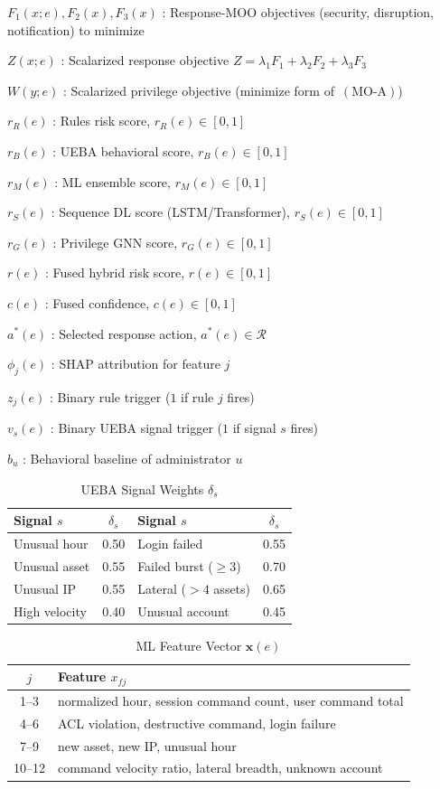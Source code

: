 \documentclass{ieeeaccess}
\begin{document}
$F_1(x;e),F_2(x),F_3(x)$ : Response-MOO objectives (security, disruption, notification) to minimize

$Z(x;e)$ : Scalarized response objective $Z=\lambda_1 F_1+\lambda_2 F_2+\lambda_3 F_3$

$W(y;e)$ : Scalarized privilege objective (minimize form of~$(\mathrm{MO}\text{-}\mathrm{A})$)

$r_R(e)$ : Rules risk score, $r_R(e)\in[0,1]$

$r_B(e)$ : UEBA behavioral score, $r_B(e)\in[0,1]$

$r_M(e)$ : ML ensemble score, $r_M(e)\in[0,1]$

$r_S(e)$ : Sequence DL score (LSTM/Transformer), $r_S(e)\in[0,1]$

$r_G(e)$ : Privilege GNN score, $r_G(e)\in[0,1]$

$r(e)$ : Fused hybrid risk score, $r(e)\in[0,1]$

$c(e)$ : Fused confidence, $c(e)\in[0,1]$

$a^*(e)$ : Selected response action, $a^*(e)\in\mathcal{R}$

$\phi_j(e)$ : SHAP attribution for feature $j$

$z_j(e)$ : Binary rule trigger ($1$ if rule $j$ fires)

$v_s(e)$ : Binary UEBA signal trigger ($1$ if signal $s$ fires)

$b_u$ : Behavioral baseline of administrator $u$
\begin{table}[!t]
\caption{UEBA Signal Weights $\delta_s$}
\label{tab:ueba-signals}
\centering
\footnotesize
\begin{tabular}{lc|lc}
\toprule
\textbf{Signal} $s$ & $\delta_s$ & \textbf{Signal} $s$ & $\delta_s$ \\
\midrule
Unusual hour & 0.50 & Login failed & 0.55 \\
Unusual asset & 0.55 & Failed burst ($\geq 3$) & 0.70 \\
Unusual IP & 0.55 & Lateral ($>4$ assets) & 0.65 \\
High velocity & 0.40 & Unusual account & 0.45 \\
\bottomrule
\end{tabular}
\end{table}

\begin{table}[!t]
\caption{ML Feature Vector $\mathbf{x}(e)$}
\label{tab:features}
\centering
\footnotesize
\begin{tabular}{cl}
\toprule
\textbf{$j$} & \textbf{Feature $x_{fj}$} \\
\midrule
1--3 & normalized hour, session command count, user command total \\
4--6 & ACL violation, destructive command, login failure \\
7--9 & new asset, new IP, unusual hour \\
10--12 & command velocity ratio, lateral breadth, unknown account \\
\bottomrule
\end{tabular}
\end{table}
\end{document}
